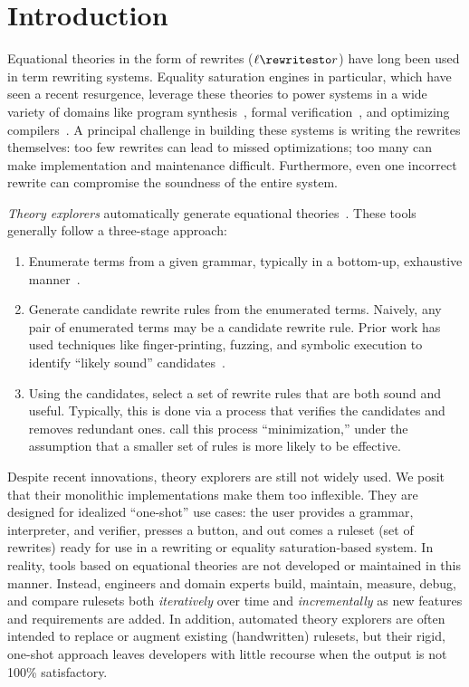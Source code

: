 \section{Introduction}
\label{sec:intro}

Equational theories in the form of rewrites ($\ell \rewritesto r$)
 have long been used in term rewriting systems.
Equality saturation engines in particular,
 which have seen a recent resurgence,
 leverage these theories to power systems in a wide
  variety of domains like program synthesis~\citep{szalinski, herbie, spores, babble, resys},
  formal verification~\citep{coq, z3, sat19, rest-darulova, sam1, sam2}, and
  optimizing compilers~\citep{eqsat, tensat, denali, wetune, deepegg, qgym, sketch-eq}.
A principal challenge in building these systems
 is writing the rewrites themselves:
 too few rewrites can lead to missed optimizations;
 too many can make implementation and maintenance difficult.
 Furthermore, even one incorrect rewrite can compromise the soundness
 of the entire system.

\textit{Theory explorers} automatically generate
 equational theories~\citep{sat19, ruler, cav21, hipster, quickspec, hipspec, isacosy}.
These tools generally follow a three-stage approach:
\begin{enumerate}
  \item
    Enumerate terms from a given grammar,
    typically in a bottom-up,
    exhaustive manner~\citep{ruler, cvc4}.
  \item
    Generate candidate rewrite rules from the enumerated terms.
    Naively, any pair of enumerated terms may be a candidate rewrite rule.
    Prior work has used techniques like finger-printing, fuzzing,
    and symbolic execution to identify ``likely sound'' candidates~\citep{ruler,sat19,cav21, bansal}.
  \item
    Using the candidates,
     select a set of rewrite rules that are both sound and useful.
    Typically,
    this is done via a process that verifies the candidates
    and removes redundant ones.
   \citet{ruler} call this process ``minimization,''
    under the assumption
    that a smaller set of rules is more likely to be effective.
\end{enumerate}

Despite recent innovations,
  theory explorers are still not widely used.
We posit that their monolithic
 implementations make them
 too inflexible.
They are designed for idealized ``one-shot'' use cases:
 the user provides a grammar, interpreter, and verifier,
 presses a button, and out comes a ruleset (set of rewrites)
 ready for use in a rewriting or equality saturation-based system.
In reality,
 tools based on equational theories
 are not developed or maintained in this manner.
Instead,
 engineers and domain experts
 build, maintain, measure, debug, and compare rulesets
 both \emph{iteratively} over time
 and \emph{incrementally} as new features and requirements are added.
In addition,
 automated theory explorers are often intended
 to replace or augment existing (handwritten) rulesets,
 but their rigid, one-shot approach
 leaves developers with little recourse
 when the output is not 100\% satisfactory.

